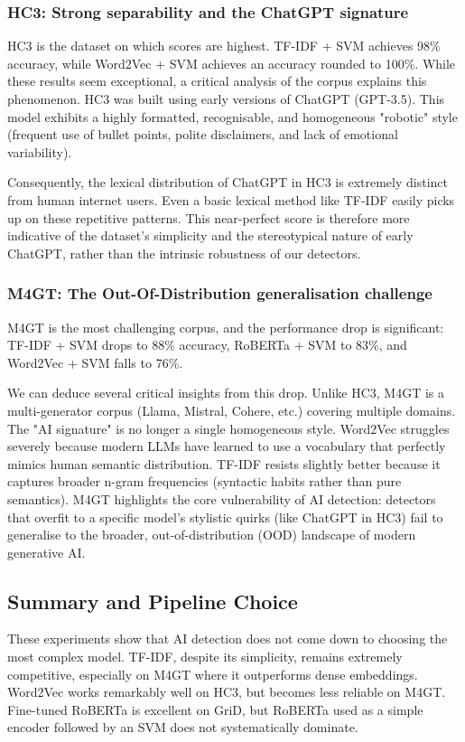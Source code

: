 \documentclass[11pt,a4paper]{article}
\begin{document}
\subsubsection{HC3: Strong separability and the ChatGPT signature}
HC3 is the dataset on which scores are highest. TF-IDF + SVM achieves 98\%
accuracy, while Word2Vec + SVM achieves an accuracy rounded to 100\%. 
While these results seem exceptional, a critical analysis of the corpus explains this phenomenon. HC3 was built using early versions of ChatGPT (GPT-3.5). This model exhibits a highly formatted, recognisable, and homogeneous "robotic" style (frequent use of bullet points, polite disclaimers, and lack of emotional variability). 

Consequently, the lexical distribution of ChatGPT in HC3 is extremely distinct from human internet users. Even a basic lexical method like TF-IDF easily picks up on these repetitive patterns. This near-perfect score is therefore more indicative of the dataset's simplicity and the stereotypical nature of early ChatGPT, rather than the intrinsic robustness of our detectors.

\subsubsection{M4GT: The Out-Of-Distribution generalisation challenge}
M4GT is the most challenging corpus, and the performance drop is significant:
TF-IDF + SVM drops to 88\% accuracy, RoBERTa + SVM to 83\%, and Word2Vec + SVM falls to 76\%. 

We can deduce several critical insights from this drop. Unlike HC3, M4GT is a multi-generator corpus (Llama, Mistral, Cohere, etc.) covering multiple domains. The "AI signature" is no longer a single homogeneous style. Word2Vec struggles severely because modern LLMs have learned to use a vocabulary that perfectly mimics human semantic distribution. TF-IDF resists slightly better because it captures broader n-gram frequencies (syntactic habits rather than pure semantics). M4GT highlights the core vulnerability of AI detection: detectors that overfit to a specific model's stylistic quirks (like ChatGPT in HC3) fail to generalise to the broader, out-of-distribution (OOD) landscape of modern generative AI.

\subsection{Summary and Pipeline Choice}
These experiments show that AI detection does not come down to choosing the
most complex model. TF-IDF, despite its simplicity, remains extremely
competitive, especially on M4GT where it outperforms dense embeddings. Word2Vec
works remarkably well on HC3, but becomes less reliable on M4GT. Fine-tuned
RoBERTa is excellent on GriD, but RoBERTa used as a simple encoder followed
by an SVM does not systematically dominate.
\end{document}
